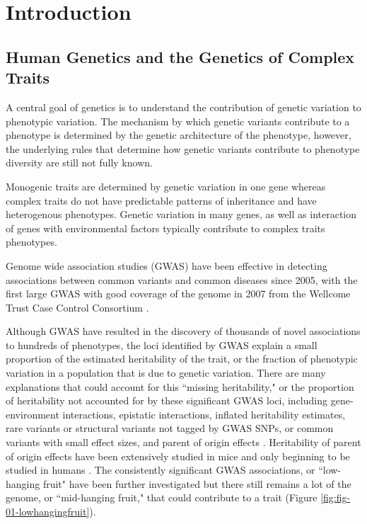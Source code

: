 
\chapter{Introduction}

\section{Human Genetics and the Genetics of Complex Traits}

A central goal of genetics is to understand the contribution of genetic variation to phenotypic variation. The mechanism by which genetic variants contribute to a phenotype is determined by the genetic architecture of the phenotype, however, the underlying rules that determine how genetic variants contribute to phenotype diversity are still not fully known. 

Monogenic traits are determined by genetic variation in one gene whereas complex traits do not have predictable patterns of inheritance and have heterogenous phenotypes. Genetic variation in many genes, as well as interaction of genes with environmental factors typically contribute to complex traits phenotypes. 

Genome wide association studies (GWAS) have been effective in detecting associations between common variants and common diseases since 2005, with the first large GWAS with good coverage of the genome in 2007 from the Wellcome Trust Case Control Consortium \cite{WellcomeTrustCaseControlConsortium:2007do}. 

Although GWAS have resulted in the discovery of thousands of novel associations to hundreds of phenotypes, the loci identified by GWAS explain a small proportion of the estimated heritability of the trait, or the fraction of phenotypic variation in a population that is due to genetic variation. There are many explanations that could account for this ``missing heritability," or the proportion of heritability not accounted for by these significant GWAS loci, including gene-environment interactions, epistatic interactions, inflated heritability estimates, rare variants or structural variants not tagged by GWAS SNPs, or common variants with small effect sizes, and parent of origin effects \cite{Zaitlen2013,Eichler:2010kd,Gibson:2012kc,Zuk:cc}. Heritability of parent of origin effects have been extensively studied in mice \cite{Babak2008,Mott2014,Babak2015,Babak2012} and only beginning to be studied in humans \cite{Laurin:2017jv}. The consistently significant GWAS associations, or ``low-hanging fruit" have been further investigated but there still remains a lot of the genome, or ``mid-hanging fruit," that could contribute to a trait (Figure \ref{fig:fig-01-lowhangingfruit}).

